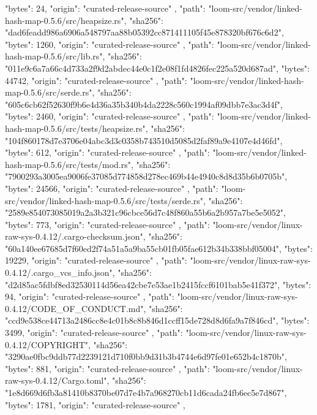 {{      "bytes": 24,
      "origin": "curated-release-source"
    },
    {
      "path": "loom-src/vendor/linked-hash-map-0.5.6/src/heapsize.rs",
      "sha256": "dad6feadd986a6906a548797aa88b05392cc871411105f45e878320bf676c6d2",
      "bytes": 1260,
      "origin": "curated-release-source"
    },
    {
      "path": "loom-src/vendor/linked-hash-map-0.5.6/src/lib.rs",
      "sha256": "011e9c6a7a66c4d733a2f9d2abdec44e0c1f2e08f1fd4826fec225a520d687ad",
      "bytes": 44742,
      "origin": "curated-release-source"
    },
    {
      "path": "loom-src/vendor/linked-hash-map-0.5.6/src/serde.rs",
      "sha256": "605c6cb62f52630f9b6e4d36a35b340b4da2228c560c1994af09dbb7e3ac3d4f",
      "bytes": 2460,
      "origin": "curated-release-source"
    },
    {
      "path": "loom-src/vendor/linked-hash-map-0.5.6/src/tests/heapsize.rs",
      "sha256": "104f860178d7e3706e04abc3d3c0358b743510d5085d2faf89a9e4107e4d46fd",
      "bytes": 612,
      "origin": "curated-release-source"
    },
    {
      "path": "loom-src/vendor/linked-hash-map-0.5.6/src/tests/mod.rs",
      "sha256": "7900293a3005ea9006fe37085d774858d278ec469b44e4940c8d8d35b6b0705b",
      "bytes": 24566,
      "origin": "curated-release-source"
    },
    {
      "path": "loom-src/vendor/linked-hash-map-0.5.6/src/tests/serde.rs",
      "sha256": "2589e854073085019a2a3b321c96cbce56d7c48f860a55b6a2b957a7be5e5052",
      "bytes": 773,
      "origin": "curated-release-source"
    },
    {
      "path": "loom-src/vendor/linux-raw-sys-0.4.12/.cargo-checksum.json",
      "sha256": "60a140ee67685d7f60ed2f74a51a5a9ba55cb01fb05fae612b34b338bbf05004",
      "bytes": 19229,
      "origin": "curated-release-source"
    },
    {
      "path": "loom-src/vendor/linux-raw-sys-0.4.12/.cargo_vcs_info.json",
      "sha256": "d2d85ac5fdbf8ed32530114d56ea42cbe7e53ae1b2415fccf6101bab5e41f372",
      "bytes": 94,
      "origin": "curated-release-source"
    },
    {
      "path": "loom-src/vendor/linux-raw-sys-0.4.12/CODE_OF_CONDUCT.md",
      "sha256": "ccd9e538ce44713a2486cc8e4c01b8c8b846d1ccff15de728d8d6fa9a7f846cd",
      "bytes": 3499,
      "origin": "curated-release-source"
    },
    {
      "path": "loom-src/vendor/linux-raw-sys-0.4.12/COPYRIGHT",
      "sha256": "3290ae0fbc9ddb77d2239121d710f0bb9d31b3b4744e6d97fe01e652b4c1870b",
      "bytes": 881,
      "origin": "curated-release-source"
    },
    {
      "path": "loom-src/vendor/linux-raw-sys-0.4.12/Cargo.toml",
      "sha256": "1e8d669d6fb3a81410b8370be07d7e4b7a968270cb11d6cada24fb6ec5e7d867",
      "bytes": 1781,
      "origin": "curated-release-source"
    },
    {
}}
